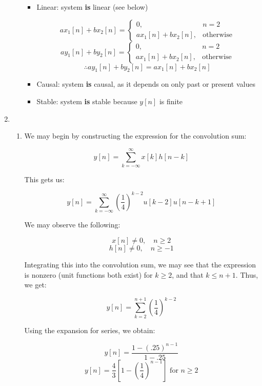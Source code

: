 \begin{enumerate}
\begin{enumerate}
\begin{itemize}
          \item Linear: system \textbf{is} linear (see below)

            $$ax_1[n]+bx_2[n]=\left\{ \begin{array}{ll} 0, & n=2\\ ax_1[n]+bx_2[n], & \text{otherwise}\end{array}$$
            $$ay_1[n]+by_2[n]=\left\{ \begin{array}{ll} 0, & n=2\\ ax_1[n]+bx_2[n], & \text{otherwise}\end{array}$$
            $$\therefore ay_1[n]+by_2[n]=ax_1[n]+bx_2[n]$$

          \item Causal: system \textbf{is} causal, as it depends on only past or present values

          \item Stable: system \textbf{is} stable because $y[n]$ is finite

        \end{itemize}

    \end{enumerate}

  \item

    \begin{enumerate}

      \item 

        We may begin by constructing the expression for the convolution sum:

        $$y[n]=\sum_{k=-\infty}^{\infty}x[k]h[n-k]$$

        This gets us:

        $$y[n]=\sum_{k=-\infty}^{\infty} \left( \frac{1}{4} \right)^{k-2}u[k-2]u[n-k+1]$$

        We may observe the following:

        $$x[n]\neq 0,\quad n\geq 2$$
        $$h[n]\neq 0,\quad n\geq -1$$

        Integrating this into the convolution sum, we may see that the expression is nonzero (unit functions both exist) for $k\geq 2$, and that $k\leq n+1$. Thus, we get:

        $$y[n]=\sum_{k=2}^{n+1} \left( \frac{1}{4} \right)^{k-2}$$

        Using the expansion for series, we obtain:

        $$y[n]=\frac{1-(.25)^{n-1}}{1-.25}$$
        $$\boxed{y[n]=\frac{4}{3}\left[ 1-\left( \frac{1}{4} \right)^{n-1} \right]\text{ for }n\geq 2}$$\\


\end{enumerate}
\end{enumerate}

